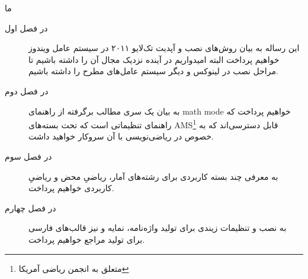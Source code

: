 \begin{preface}[مقدمه]
ما
\begin{description}
\item[در فصل اول]
 این رساله به بیان روش‌های نصب و آپدیت تک‌لایو ۲۰۱۱ در سیستم عامل ویندوز خواهیم پرداخت البته امیدواریم در آینده نزدیک مجال آن را داشته باشیم تا مراحل نصب در لینوکس و دیگر سیستم عامل‌های مطرح را داشته باشیم.
\item[در فصل دوم]
به بیان یک سری مطالب برگرفته از راهنمای math mode خواهیم پرداخت که راهنمای تنظیماتی است که تحت بسته‌های AMS\footnote{متعلق به انجمن ریاضی آمریکا} قابل دسترسی‌اند که به خصوص در ریاضی‌نویسی با آن سروکار خواهید داشت.
\item[در فصل سوم]
به معرفی چند بسته کاربردی برای رشته‌های آمار، ریاضیِ محض و ریاضیِ کاربردی خواهیم پرداخت.
\item[در فصل چهارم]
به نصب و تنظیمات زیندی برای تولید واژه‌نامه، نمایه و نیز قالب‌های فارسی برای تولید مراجع خواهیم پرداخت.
\end{description}
\end{preface}